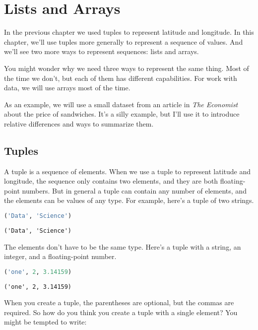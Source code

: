 \chapter{Lists and Arrays}\label{lists-and-arrays}

In the previous chapter we used tuples to represent latitude and
longitude. In this chapter, we'll use tuples more generally to represent
a sequence of values. And we'll see two more ways to represent
sequences: lists and arrays.

You might wonder why we need three ways to represent the same thing.
Most of the time we don't, but each of them has different capabilities.
For work with data, we will use arrays most of the time.

As an example, we will use a small dataset from an article in \textit{The
Economist} about the price of sandwiches. It's a silly example, but I'll
use it to introduce relative differences and ways to summarize them.

\section{Tuples}\label{tuples}

A tuple is a sequence of elements. When we use a tuple to represent
latitude and longitude, the sequence only contains two elements, and
they are both floating-point numbers. But in general a tuple can contain
any number of elements, and the elements can be values of any type. For
example, here's a tuple of two strings.

\begin{lstlisting}[language=Python,style=source]
('Data', 'Science')
\end{lstlisting}

\begin{lstlisting}[style=output]
('Data', 'Science')
\end{lstlisting}

The elements don't have to be the same type. Here's a tuple with a
string, an integer, and a floating-point number.

\begin{lstlisting}[language=Python,style=source]
('one', 2, 3.14159)
\end{lstlisting}

\begin{lstlisting}[style=output]
('one', 2, 3.14159)
\end{lstlisting}

When you create a tuple, the parentheses are optional, but the commas
are required. So how do you think you create a tuple with a single
element? You might be tempted to write:


